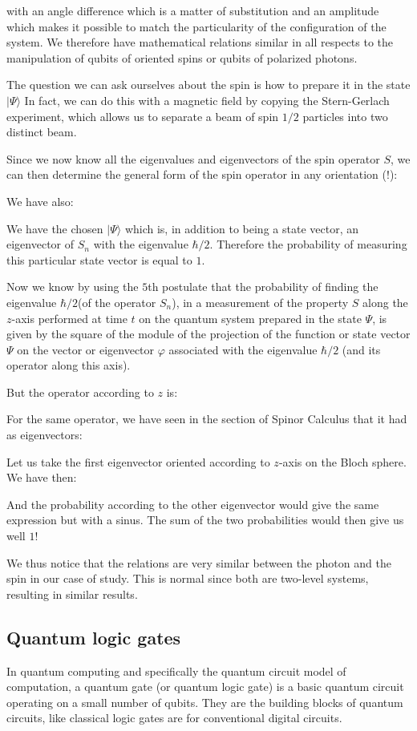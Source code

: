 	with an angle difference which is a matter of substitution and an amplitude which makes it possible to match the particularity of the configuration of the system. We therefore have mathematical relations similar in all respects to the manipulation of qubits of oriented spins or qubits of polarized photons.

	The question we can ask ourselves about the spin is how to prepare it in the state $|\Psi\rangle$ In fact, we can do this with a magnetic field by copying the Stern-Gerlach experiment, which allows us to separate a beam of spin $1/2$ particles into two distinct beam.

	Since we now know all the eigenvalues and eigenvectors of the spin operator $S$, we can then determine the general form of the spin operator in any orientation (!):
	
	We have also:
	
	We have the chosen $|\Psi\rangle$ which is, in addition to being a state vector, an eigenvector of $S_n$ with the eigenvalue $\hbar/2$. Therefore the probability of measuring this particular state vector is equal to $1$.

	Now we know by using the $5$th postulate that the probability of finding the eigenvalue $\hbar/2$(of the operator $S_n$), in a measurement of the property $S$ along the $z$-axis performed at time $t$ on the quantum system prepared in the state $\Psi$, is given by the square of the module of the projection of the function or state vector $\Psi$ on the vector or eigenvector $\varphi$ associated with the eigenvalue $\hbar/2$ (and its operator along this axis).

	But the operator according to $z$ is:
	
	For the same operator, we have seen in the section of Spinor Calculus that it had as eigenvectors:
	
	Let us take the first eigenvector oriented according to $z$-axis on the Bloch sphere. We have then:
	
	And the probability according to the other eigenvector would give the same expression but with a sinus. The sum of the two probabilities would then give us well $1$!

	We thus notice that the relations are very similar between the photon and the spin in our case of study. This is normal since both are two-level systems, resulting in similar results.
	
	\subsection{Quantum logic gates}
	In quantum computing and specifically the quantum circuit model of computation, a quantum gate (or quantum logic gate) is a basic quantum circuit operating on a small number of qubits. They are the building blocks of quantum circuits, like classical logic gates are for conventional digital circuits.
	
